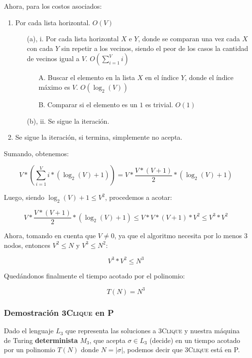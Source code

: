 \documentclass[spanish, draft]{article}
\begin{document}
    \begin{figure}[H]
      \centering
    \end{figure}
    
    Ahora, para los costos asociados:
    \begin{enumerate}
      \item Por cada lista horizontal. $O(V)$
            \begin{enumerate}
              \item[(a), i.] Por cada lista horizontal $X$ e $Y$, donde se comparan una vez cada $X$ con cada $Y$ sin repetir a los vecinos, siendo el peor de los casos la cantidad de vecinos igual a $V$. $O( \sum\limits_{i=1}^V{i} )$
                              \begin{enumerate}
                                \item[A.] Buscar el elemento en la lista $X$ en el índice $Y$, donde el índice máximo es $V$. $O(\log_2(V))$
                                \item[B.] Comparar si el elemento es un $1$ es trivial. $O(1)$
                              \end{enumerate}
              \item[(b), ii.] Se sigue la iteración.
            \end{enumerate}
      \item Se sigue la iteración, si termina, simplemente no acepta.
    \end{enumerate}
    
    Sumando, obtenemos:
    
    $$V * \left( \sum\limits_{i=1}^V{i} * (\log_2(V) + 1) \right) = V * \frac{V*(V+1)}{2} * (\log_2(V) + 1)$$
    
    Luego, siendo $\log_2(V) + 1 \leq V^2$, procedemos a acotar:
    
    $$V * \frac{V*(V+1)}{2} * (\log_2(V) + 1) \leq V * V * (V + 1) * V^2 \leq V^3 * V^2$$
    
    Ahora, tomando en cuenta que $V \neq 0$, ya que el algoritmo necesita por lo menos 3 nodos, entonces $V^2 \leq N$ y $V^3 \leq N^2$:
    
    $$V^3 * V^2 \leq N^3$$
    
    Quedándonos finalmente el tiempo acotado por el polinomio:
    
    $$T(N) = N^3$$
    
    \subsubsection{Demostración \textsc{3Clique} en P}
    Dado el lenguaje $L_3$ que representa las soluciones a \textsc{3Clique} y nuestra máquina de Turing \textbf{determinista} $M_3$, que acepta $\sigma \in L_3$ (decide) en un tiempo acotado por un polinomio $T(N)$ donde $N = |\sigma|$, podemos decir que \textsc{3Clique} está en P.
  
\end{document}
